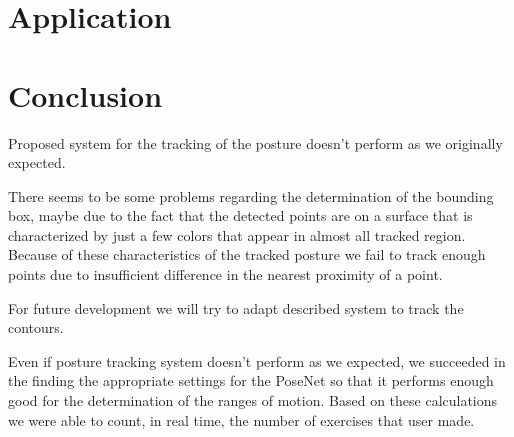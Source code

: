 \documentclass[runningheads,a4paper,11pt]{report}
\begin{document}
\chapter{Application}
\chapter{Conclusion}
\par Proposed system for the tracking of the posture doesn\mbox{'}t perform as we originally expected.
\par There seems to be some problems regarding the determination of the bounding box, maybe due to the fact that the detected points are on a surface that is characterized by just a few colors that appear in almost all tracked region. Because of these characteristics of the tracked posture we fail to track enough points due to insufficient difference in the nearest proximity of a point. 

\par For future development we will try to adapt described system to track the contours.

Even if posture tracking system doesn\mbox{'}t perform as we expected, we succeeded in the finding the appropriate settings for the PoseNet so that it performs enough good for the determination of the ranges of motion. Based on these calculations we were able to count, in real time, the number of exercises that user made.




\end{document}
